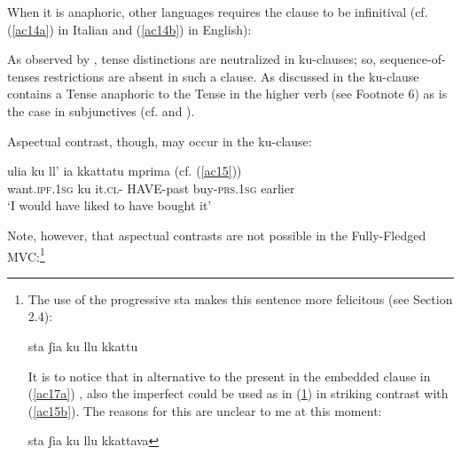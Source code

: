 \documentclass[output=paper]{langscibook}
\begin{document}
When it is anaphoric, other languages requires the clause to be infinitival (cf. (\ref{ac14a}) in Italian and (\ref{ac14b}) in English):

\ea \label{ac14}
    \z
\z

 As observed by \cite{calabrese1993a}, tense distinctions are neutralized in ku-clauses; so, sequence-of-tenses restrictions are absent in such a clause.  As discussed in \cite{calabrese1993a} the ku-clause contains a Tense anaphoric to the Tense in the higher verb (see Footnote 6) as is the case in subjunctives (cf. \cite[p46-48]{calabrese1993a} and \cite[p652]{manzini2005a}).

\ea \label{ac15}
    \z
\z
     
Aspectual contrast, though, may occur in the ku-clause:

\ea \label{ac16}\gll ulia         ku  ll’   ia    kkattatu     mprima  (cf. (\ref{ac15}))\\
  want.\textsc{ipf}.\textsc{1sg} ku  it.\textsc{cl}- HAVE-past buy-\textsc{prs}.\textsc{1sg} earlier\\
 \glt ‘I would have liked to have bought it’
\z

Note, however, that aspectual contrasts are not possible in the Fully-Fledged MVC:\footnote{The use of the progressive sta makes this sentence more felicitous (see Section 2.4):

\ea \label{fn7ex} {sta ʃia ku llu kkattu}
\z

It is to notice that in alternative to the present in the embedded clause in (\ref{ac17a}) , also the imperfect could be used as in (\ref{fn7ex2}) in striking contrast with (\ref{ac15b}). The reasons for this are unclear to me at this moment:

\ea \label{fn7ex2}{sta ʃia ku llu kkattava}
\z}
\end{document}
